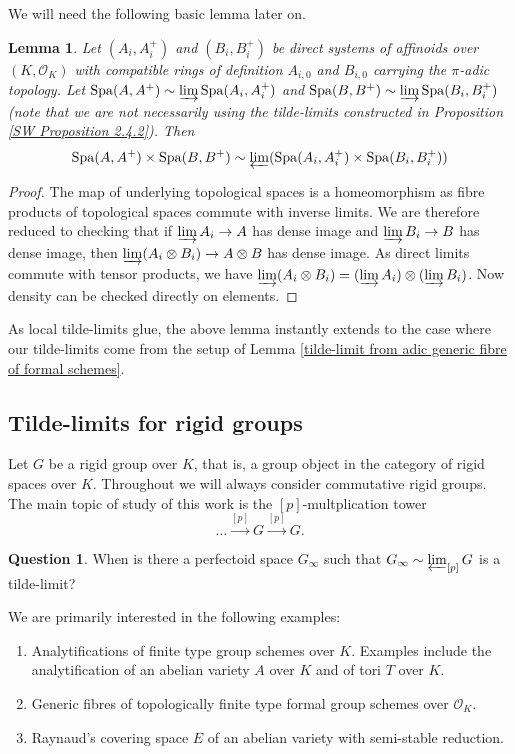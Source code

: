 \documentclass[10pt,oneside]{amsart}
\newtheorem{lemma}[theorem]{Lemma}
\theoremstyle{definition}
\newtheorem{question}[mainthm]{Question}
\begin{document}
We will need the following basic lemma later on.

	\begin{lemma}\label{affinoid tilde-limits commute with fibre products}
		Let $(A_i, A_i^+)$ and $(B_i, B_i^+)$ be direct systems of affinoids over $(K, \mathcal O_K)$ with compatible rings of definition $A_{i,0}$ and $B_{i,0}$ carrying the $\pi$-adic topology. Let $\operatorname{Spa}(A, A^+)\sim \varinjlim \operatorname{Spa}(A_i, A_i^+)$ and $\operatorname{Spa}(B, B^+)\sim \varinjlim \operatorname{Spa}(B_i, B_i^+)$ (note that we are not necessarily using the tilde-limits constructed in Proposition \ref{SW Proposition 2.4.2}). Then \[\operatorname{Spa}(A, A^+)\times\operatorname{Spa}(B, B^+)\sim\varprojlim (\operatorname{Spa}(A_i, A_i^+)\times \operatorname{Spa}(B_i, B_i^+))\]
	\end{lemma}
	
	\begin{proof}
		The map of underlying topological spaces is a homeomorphism as fibre products of topological spaces commute with inverse limits. We are therefore reduced to checking that if $\varinjlim A_i \rightarrow A$ has dense image and $\varinjlim B_i \rightarrow B$ has dense image, then $\varinjlim (A_i\otimes B_i) \rightarrow A\otimes B$ has dense image. As direct limits commute with tensor products, we have $\varinjlim (A_i\otimes B_i) = (\varinjlim A_i)\otimes (\varinjlim B_i)$. Now density can be checked directly on elements. 
	\end{proof}
	
	As local tilde-limits glue, the above lemma instantly extends to the case where our tilde-limits come from the setup of Lemma \ref{tilde-limit from adic generic fibre of formal schemes}.
	
\subsection{Tilde-limits for rigid groups}

Let $G$ be a rigid group over $K$, that is, a group object in the category of rigid spaces over $K$. Throughout we will always consider commutative rigid groups. The main topic of study of this work is the $[p]$-multplication tower
\[ \dots\xrightarrow{[p]}G\xrightarrow{[p]}G.\]
\begin{question}
	When is there a perfectoid space $G_\infty$ such that $G_\infty \sim \varprojlim_{[p]} G$ is a tilde-limit?
\end{question}
We are primarily interested in the following examples:
\begin{enumerate}	 
\item Analytifications of finite type group schemes over $K$. Examples include the analytification of an abelian variety $A$ over $K$ and of tori $T$ over $K$.
\item Generic fibres of topologically finite type formal group schemes over $\mathcal O_K$.
\item Raynaud's covering space $E$  of an abelian variety with semi-stable reduction.
\end{enumerate}
\end{document}

